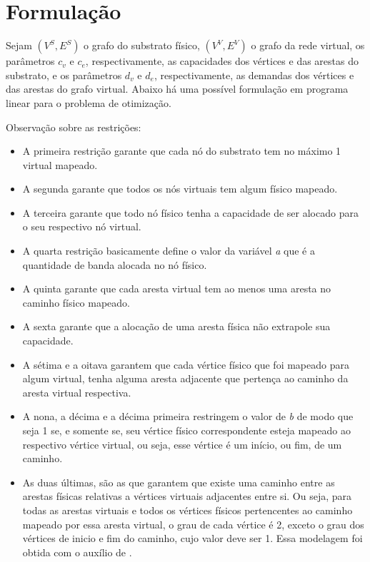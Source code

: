 \documentclass{article}
\begin{document}
\section{Formulação}
Sejam $(V^{S},E^{S})$ o grafo do substrato físico, $(V^{V},E^{V})$ o grafo da rede virtual, os parâmetros $c_{v}$ e $c_{e}$, respectivamente, as capacidades dos vértices e das arestas do substrato, e os parâmetros $d_{v}$ e $d_{e}$, respectivamente, as demandas dos vértices e das arestas do grafo virtual. Abaixo há uma possível formulação em programa linear para o problema de otimização.

Observação sobre as restrições:
\begin{itemize}
\item A primeira restrição garante que cada nó do substrato tem no máximo 1 virtual mapeado.
\item A segunda garante que todos os nós virtuais tem algum físico mapeado.
\item A terceira garante que todo nó físico tenha a capacidade de ser alocado para o seu respectivo nó virtual.
\item A quarta restrição basicamente define o valor da variável \emph{a} que é a quantidade de banda alocada no nó físico.
\item A quinta garante que cada aresta virtual tem ao menos uma aresta no caminho físico mapeado.
\item A sexta garante que a alocação de uma aresta física não extrapole sua capacidade.
\item A sétima e a oitava garantem que cada vértice físico que foi mapeado para algum virtual, tenha alguma aresta adjacente que pertença ao caminho da aresta virtual respectiva.
\item A nona, a décima e a décima primeira restringem o valor de \emph{b} de modo que seja 1 se, e somente se, seu vértice físico correspondente esteja mapeado ao respectivo vértice virtual, ou seja, esse vértice é um início, ou fim, de um caminho.
\item As duas últimas, são as que garantem que existe uma caminho entre as arestas físicas relativas a vértices virtuais adjacentes entre si. Ou seja, para todas as arestas virtuais e todos os vértices físicos pertencentes ao caminho mapeado por essa aresta virtual, o grau de cada vértice é 2, exceto o grau dos vértices de inicio e fim do caminho, cujo valor deve ser 1. Essa modelagem foi obtida com o auxílio de \cite{ABSOLUTE}.
\end{itemize}
\end{document}
